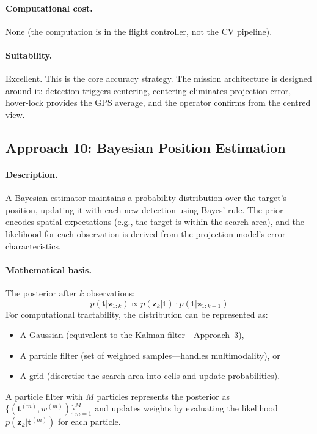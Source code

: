 \paragraph{Computational cost.}  None (the computation is in the flight controller, not the CV pipeline).

\paragraph{Suitability.}  Excellent.  This is the core accuracy strategy.  The mission architecture is designed around it: detection triggers centering, centering eliminates projection error, hover-lock provides the GPS average, and the operator confirms from the centred view.

\subsection{Approach 10: Bayesian Position Estimation}\label{sec:approach-bayesian}

\paragraph{Description.}
A Bayesian estimator maintains a probability distribution over the target's position, updating it with each new detection using Bayes' rule.  The prior encodes spatial expectations (e.g., the target is within the search area), and the likelihood for each observation is derived from the projection model's error characteristics.

\paragraph{Mathematical basis.}
The posterior after $k$ observations:
\begin{equation}
  p(\mathbf{t} | \mathbf{z}_{1:k}) \propto p(\mathbf{z}_k | \mathbf{t}) \cdot p(\mathbf{t} | \mathbf{z}_{1:k-1})
\end{equation}
For computational tractability, the distribution can be represented as:
\begin{itemize}
  \item A Gaussian (equivalent to the Kalman filter---Approach~3),
  \item A particle filter (set of weighted samples---handles multimodality), or
  \item A grid (discretise the search area into cells and update probabilities).
\end{itemize}
A particle filter with $M$ particles represents the posterior as $\{(\mathbf{t}^{(m)}, w^{(m)})\}_{m=1}^M$ and updates weights by evaluating the likelihood $p(\mathbf{z}_k | \mathbf{t}^{(m)})$ for each particle.

